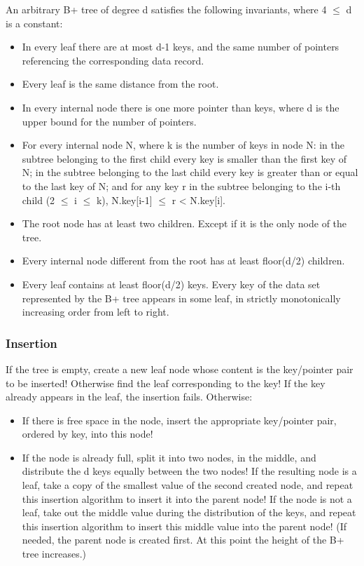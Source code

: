 \documentclass[margin=0px]{article}
\begin{document}
An arbitrary B+ tree of degree d satisfies the following invariants, where 4 $\leq$ d is a constant:
\begin{itemize}
    \item In every leaf there are at most d-1 keys, and the same number of pointers referencing the corresponding data record.
    \item Every leaf is the same distance from the root.
    \item In every internal node there is one more pointer than keys, where d is the upper bound for the number of pointers.
    \item For every internal node N, where k is the number of keys in node N: in the subtree belonging to the first child every key is smaller than the first key of N; in the subtree belonging to the last child every key is greater than or equal to the last key of N; and for any key r in the subtree belonging to the i-th child (2 $\leq$ i $\leq$ k), N.key[i-1] $\leq$ r < N.key[i].
    \item The root node has at least two children. Except if it is the only node of the tree.
    \item Every internal node different from the root has at least floor(d/2) children.
    \item Every leaf contains at least floor(d/2) keys. Every key of the data set represented by the B+ tree appears in some leaf, in strictly monotonically increasing order from left to right.
\end{itemize}

\subsubsection{Insertion}
If the tree is empty, create a new leaf node whose content is the key/pointer pair to be inserted!
Otherwise find the leaf corresponding to the key! If the key already appears in the leaf, the insertion fails. Otherwise:
\begin{itemize}
    \item If there is free space in the node, insert the appropriate key/pointer pair, ordered by key, into this node!
    \item  If the node is already full, split it into two nodes, in the middle, and distribute the d keys equally between the two nodes! If the resulting node is a leaf, take a copy of the smallest value of the second created node, and repeat this insertion algorithm to insert it into the parent node! If the node is not a leaf, take out the middle value during the distribution of the keys, and repeat this insertion algorithm to insert this middle value into the parent node! (If needed, the parent node is created first. At this point the height of the B+ tree increases.)
\end{itemize}
\end{document}
